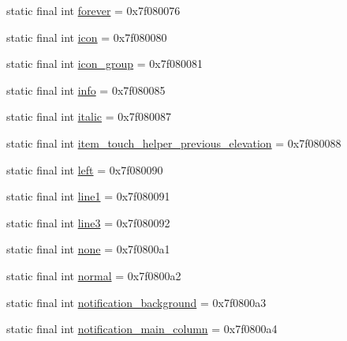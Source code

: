 \begin{DoxyCompactItemize}
\item 
static final int \mbox{\hyperlink{classandroid_1_1support_1_1v7_1_1recyclerview_1_1_r_1_1id_a22c27e2ae47d30605c44c3a48b1f2fb7}{forever}} = 0x7f080076
\item 
static final int \mbox{\hyperlink{classandroid_1_1support_1_1v7_1_1recyclerview_1_1_r_1_1id_a0258f338bdda76b913eab68362944537}{icon}} = 0x7f080080
\item 
static final int \mbox{\hyperlink{classandroid_1_1support_1_1v7_1_1recyclerview_1_1_r_1_1id_a031a504af71bacf3b5cebafe39be7ef1}{icon\+\_\+group}} = 0x7f080081
\item 
static final int \mbox{\hyperlink{classandroid_1_1support_1_1v7_1_1recyclerview_1_1_r_1_1id_a1e3b72ba68917db80be318439989b3e0}{info}} = 0x7f080085
\item 
static final int \mbox{\hyperlink{classandroid_1_1support_1_1v7_1_1recyclerview_1_1_r_1_1id_a39cdd776ad969b76fdbfc2ef613e70cc}{italic}} = 0x7f080087
\item 
static final int \mbox{\hyperlink{classandroid_1_1support_1_1v7_1_1recyclerview_1_1_r_1_1id_a352aa4de609b37793eb654583f20c49c}{item\+\_\+touch\+\_\+helper\+\_\+previous\+\_\+elevation}} = 0x7f080088
\item 
static final int \mbox{\hyperlink{classandroid_1_1support_1_1v7_1_1recyclerview_1_1_r_1_1id_ac347b5f0466089f6370289b5ea923b6b}{left}} = 0x7f080090
\item 
static final int \mbox{\hyperlink{classandroid_1_1support_1_1v7_1_1recyclerview_1_1_r_1_1id_af6533e109a73fa5115fe4b5cab55a198}{line1}} = 0x7f080091
\item 
static final int \mbox{\hyperlink{classandroid_1_1support_1_1v7_1_1recyclerview_1_1_r_1_1id_abc21aba6639e4fd828ebff54f53eac5f}{line3}} = 0x7f080092
\item 
static final int \mbox{\hyperlink{classandroid_1_1support_1_1v7_1_1recyclerview_1_1_r_1_1id_adf2383f9c00605856555732e323328d5}{none}} = 0x7f0800a1
\item 
static final int \mbox{\hyperlink{classandroid_1_1support_1_1v7_1_1recyclerview_1_1_r_1_1id_aa12718636a0299bf9ad6966c0bfb6117}{normal}} = 0x7f0800a2
\item 
static final int \mbox{\hyperlink{classandroid_1_1support_1_1v7_1_1recyclerview_1_1_r_1_1id_aa00fb481f9af72f8598735bf245d80dc}{notification\+\_\+background}} = 0x7f0800a3
\item 
static final int \mbox{\hyperlink{classandroid_1_1support_1_1v7_1_1recyclerview_1_1_r_1_1id_a958f3f5dac93ab9d88fcef1e01f74360}{notification\+\_\+main\+\_\+column}} = 0x7f0800a4

\end{DoxyCompactItemize}
